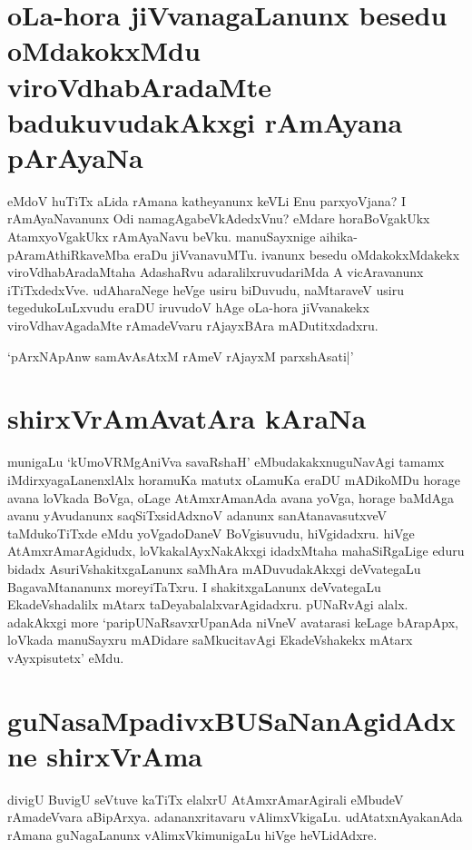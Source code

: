 \section*{oLa-hora jiVvanagaLanunx besedu oMdakokxMdu viroVdhabAradaMte badukuvudakAkxgi rAmAyana pArAyaNa}

eMdoV huTiTx aLida rAmana katheyanunx keVLi Enu parxyoVjana? I rAmAyaNavanunx Odi namagAgabeVkAdedxVnu? eMdare horaBoVgakUkx AtamxyoVgakUkx rAmAyaNavu beVku. manuSayxnige aihika-pAramAthiRkaveMba eraDu jiVvanavuMTu. ivanunx besedu oMdakokxMdakekx viroVdhabAradaMtaha AdashaRvu adaralilxruvudariMda A‌ vicAravanunx iTiTxdedxVve. udAharaNege heVge usiru biDuvudu, naMtaraveV usiru tegedukoLuLxvudu eraDU iruvudoV hAge oLa-hora jiVvanakekx viroVdhavAgadaMte rAmadeVvaru rAjayxBAra mADutitxdadxru.

\begin{shloka}
`pArxNApAnw samAvAsAtxM rAmeV rAjayxM parxshAsati|'\label{222a}
\end{shloka}

\section*{shirxVrAmAvatAra kAraNa}

munigaLu `kUmoVRMgAniVva savaRshaH'\label{222} eMbudakakxnuguNavAgi tamamx iMdirxyagaLanenxlAlx horamuKa matutx oLamuKa eraDU mADikoMDu horage avana loVkada BoVga, oLage AtAmxrAmanAda avana yoVga, horage baMdAga avanu yAvudanunx saqSiTxsidAdxnoV adanunx sanAtanavasutxveV taMdukoTiTxde eMdu yoVgadoDaneV BoVgisuvudu, hiVgidadxru. hiVge AtAmxrAmarAgidudx, loVkakalAyxNakAkxgi idadxMtaha mahaSiRgaLige eduru bidadx AsuriVshakitxgaLanunx saMhAra mADuvudakAkxgi deVvategaLu BagavaMtananunx moreyiTaTxru. I shakitxgaLanunx deVvategaLu EkadeVshadalilx mAtarx taDeyabalalxvarAgidadxru. pUNaRvAgi alalx. adakAkxgi more `paripUNaRsavxrUpanAda niVneV avatarasi keLage bArapApx, loVkada manuSayxru mADidare saMkucitavAgi EkadeVshakekx mAtarx vAyxpisutetx' eMdu.

\section*{guNasaMpadivxBUSaNanAgidAdxne shirxVrAma}

divigU BuvigU seVtuve kaTiTx elalxrU AtAmxrAmarAgirali eMbudeV rAmadeVvara aBipArxya. adananxritavaru vAlimxVkigaLu. udAtatxnAyakanAda rAmana guNagaLanunx vAlimxVkimunigaLu hiVge heVLidAdxre.

